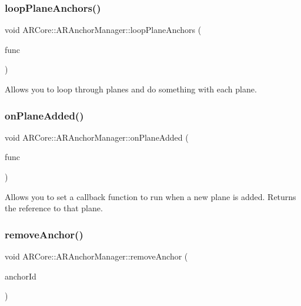 \subsubsection{\texorpdfstring{loop\+Plane\+Anchors()}{loopPlaneAnchors()}\hspace{0.1cm}{\footnotesize\ttfamily [2/2]}}
{\footnotesize\ttfamily void A\+R\+Core\+::\+A\+R\+Anchor\+Manager\+::loop\+Plane\+Anchors (\begin{DoxyParamCaption}\item[{std\+::function$<$ void(\hyperlink{struct_a_r_objects_1_1_plane_anchor_object}{Plane\+Anchor\+Object}, int index)$>$}]{func }\end{DoxyParamCaption})}



Allows you to loop through planes and do something with each plane. 

\mbox{\label{class_a_r_core_1_1_a_r_anchor_manager_a1823c29c5b2d0d407e66b98378bf8c5f}} 
\subsubsection{\texorpdfstring{on\+Plane\+Added()}{onPlaneAdded()}}
{\footnotesize\ttfamily void A\+R\+Core\+::\+A\+R\+Anchor\+Manager\+::on\+Plane\+Added (\begin{DoxyParamCaption}\item[{std\+::function$<$ void(\hyperlink{struct_a_r_objects_1_1_plane_anchor_object}{Plane\+Anchor\+Object} plane)$>$}]{func }\end{DoxyParamCaption})}

Allows you to set a callback function to run when a new plane is added. Returns the reference to that plane. \mbox{\label{class_a_r_core_1_1_a_r_anchor_manager_a28ed88e530bc1991e59f26e6b580d5c5}} 
\subsubsection{\texorpdfstring{remove\+Anchor()}{removeAnchor()}\hspace{0.1cm}{\footnotesize\ttfamily [1/2]}}
{\footnotesize\ttfamily void A\+R\+Core\+::\+A\+R\+Anchor\+Manager\+::remove\+Anchor (\begin{DoxyParamCaption}\item[{N\+S\+U\+U\+ID $\ast$}]{anchor\+Id }\end{DoxyParamCaption})}



